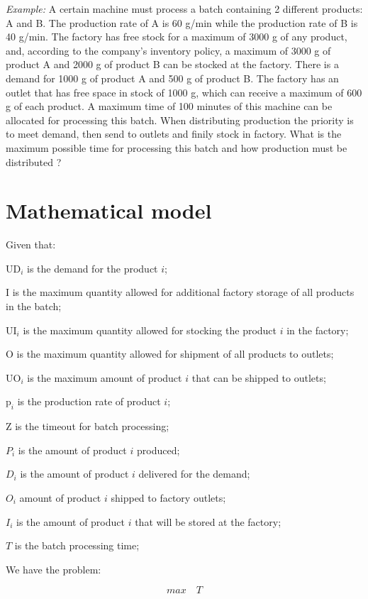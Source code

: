 \documentclass[authoryear,manuscript,12pt]{elsarticle}
\begin{document}
\emph{Example:} A certain machine must process a batch containing 2 different products: A and B. The production rate of A is 60 g/min while the production rate of B is 40 g/min. The factory has free stock for a maximum of 3000 g of any product, and, according to the company's inventory policy, a maximum of 3000 g of product A and 2000 g of product B can be stocked at the factory. There is a demand for 1000 g of product A and 500 g of product B. The factory has an outlet that has free space in stock of 1000 g, which can receive a maximum of 600 g of each product. A maximum time of 100 minutes of this machine can be allocated for processing this batch. When distributing production the priority is to meet demand, then send to outlets and finily stock in factory. What is the maximum possible time for processing this batch and how production must be distributed ? 

\section{Mathematical model}
\label{sec:mathModel}

Given that:

$\textrm{UD}_i$ is the demand for the product $i$;

$\textrm{I}$ is the maximum quantity allowed for additional factory storage of all products in the batch;

$\textrm{UI}_i$ is the maximum quantity allowed for stocking the product $i$ in the factory;

$\textrm{O}$ is the maximum quantity allowed for shipment of all products to outlets;

$\textrm{UO}_i$ is the maximum amount of product $i$ that can be shipped to outlets;

$\textrm{p}_i$ is the production rate of product $i$;

$\textrm{Z}$ is the timeout for batch processing;

$P_i$ is the amount of product $i$ produced;

$D_i$ is the amount of product $i$ delivered for the demand;

$O_i$ amount of product $i$ shipped to factory outlets;

$I_i$ is the amount of product $i$ that will be stored at the factory;

$T$ is the batch processing time;

We have the problem:

\begin{equation}
\label{MBPTMP01}
max \quad T
\end{equation}
\end{document}
